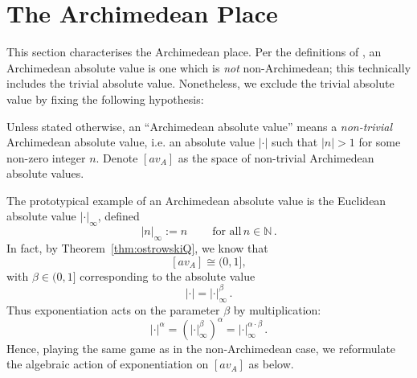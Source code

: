 \documentclass[a4paper, 11pt,reqno]{amsart}
\newcommand{\N}{\mathbb{N}}
\begin{document}

\section{The Archimedean Place}\label{sec:Arch}

This section characterises the Archimedean place. Per the definitions of \cite{NVOstrowski}, an Archimedean absolute value is one which is {\em not} non-Archimedean; this technically includes the trivial absolute value. Nonetheless, we exclude the trivial absolute value by fixing the following hypothesis:

\begin{hypothesis} Unless stated otherwise, an ``Archimedean absolute value'' means a {\em non-trivial} Archimedean absolute value, i.e. an absolute value $|\cdot|$  such that  $|n|>1$ for some non-zero integer $n$. Denote $[av_A]$
as the space of non-trivial Archimedean absolute values. 	
\end{hypothesis}

The prototypical example of an Archimedean absolute value is the {Euclidean absolute value} $|\cdot|_\infty$, defined
$$|n|_\infty:= n\ \qquad\text{for all}\, n\in\N\,.$$
In fact, by Theorem~\ref{thm:ostrowskiQ}, we know that $$[av_A]\cong (0,1],$$
with $\beta\in(0,1]$ corresponding to the absolute value
$$|\cdot|=|\cdot|_{\infty}^\beta\,.$$
Thus exponentiation acts on the parameter $\beta$ by multiplication:
$$|\cdot|^\alpha=\left(|\cdot|_{\infty}^\beta\right)^\alpha=|\cdot|_{\infty}^{\alpha\cdot\beta}\,.$$
Hence, playing the same game as in the non-Archimedean case, we reformulate the algebraic action of exponentiation on $[av_A]$ as below.
\end{document}

